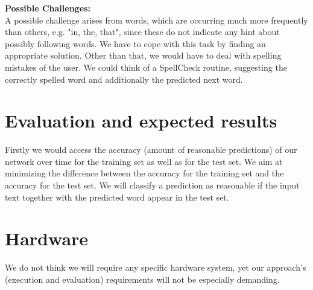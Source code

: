 \documentclass[a4paper,11pt]{scrartcl}
\begin{document}
\textbf{Possible Challenges:}\\
A possible challenge arises from words, which are occurring much more frequently than others, e.g. "in, the, that", since these do not indicate any hint about possibly following words. We have to cope with this task by finding an appropriate solution. Other than that, we would have to deal with spelling mistakes of the user. We could think of a SpellCheck routine, suggesting the correctly spelled word and additionally the predicted next word.


\section*{Evaluation and expected results}
Firstly we would access the accuracy (amount of reasonable predictions) of our network over time for the training set as well as for the test set. We aim at minimizing the difference between the accuracy for the training set and the accuracy for the test set. We will classify a prediction as reasonable if the input text together with the predicted word appear in the test set.  

\section*{Hardware}

We do not think we will require any specific hardware system, yet our approach's (execution and evaluation) requirements will not be especially demanding.
\end{document}
